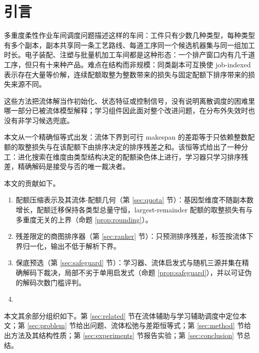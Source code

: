 \section{引言}\label{sec:intro}

多重度柔性作业车间调度问题描述这样的车间：工件只有少数几种类型，每种类型有多个副本，副本共享同一条工艺路线、每道工序同一个候选机器集与同一组加工时长。电子装配、注塑与批量机加工车间都是这种形态：一个排产窗口内有几千道工序，但只有十来种产品。难点在结构而非规模：同类副本可互换使 job-indexed 表示存在大量等价解，连续配额取整为整数带来的损失与固定配额下排序带来的损失来源不同。

这些方法把流体解当作初始化、状态特征或控制信号，没有说明离散调度的困难里哪一部分已被流体模型解释；学习组件因此面对整个改进问题，在分布外失效时也没有非学习候选兜底。

本文从一个精确恒等式出发：流体下界到可行 makespan 的差距等于只依赖整数配额的取整损失与在该配额下由排序决定的排序残差之和。该恒等式给出了一种分工：进化搜索在维度由类型结构决定的配额染色体上进行，学习器只学习排序残差，精确解码是接受与否的唯一裁决者。


本文的贡献如下。
\begin{enumerate}
  \item 配额压缩表示及其流体-配额几何（第 \ref{sec:quota} 节）：基因型维度不随副本数增长，配额迁移保持各类型总量守恒，largest-remainder 配额的取整损失有与多重度无关的上界（命题 \ref{prop:rounding}）。
  \item 残差限定的商图排序器（第 \ref{sec:ranker} 节）：只预测排序残差，标签按流体下界归一化，输出不低于解析下界。
  \item 保底预选（第 \ref{sec:safeguard} 节）：学习器、流体启发式与随机三源并集在精确解码下裁决，局部不劣于单用启发式（命题 \ref{prop:safeguard}），并以可证伪的解码次数门槛评判。
  \item {}
\end{enumerate}

本文其余部分组织如下。第 \ref{sec:related} 节在流体辅助与学习辅助调度中定位本文；第 \ref{sec:problem} 节给出问题、流体松弛与差距恒等式；第 \ref{sec:method} 节给出方法及其结构性质；第 \ref{sec:experiments} 节报告实验；第 \ref{sec:conclusion} 节总结。
